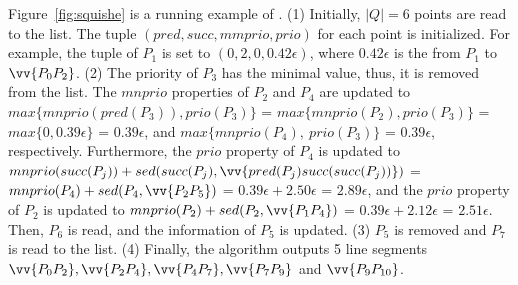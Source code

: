 \begin{example}
\label{exm-alg-squishe}
Figure~\ref{fig:squishe} is a running example of \squishe.
(1) Initially, $|Q| = 6$ points are read to the list. The tuple $(pred, succ, mmprio, prio)$ for each point is initialized. For example, the tuple of $P_1$ is set to $(0, 2, 0, 0.42\epsilon)$, where $0.42\epsilon$ is the \sed from $P_1$ to $\vv{P_0P_2}$.
(2) The priority of $P_3$ has the minimal value, thus, it is removed from the list.
The $mnprio$ properties of $P_2$ and $P_4$ are updated to $max\{mnprio(pred(P_3)), prio(P_3)\}$ = $max\{mnprio(P_2), prio(P_3)\}$ = $max\{0, 0.39\epsilon\}$ = $0.39\epsilon$, and $max\{mnprio(P_4), ~prio(P_3)\}$ = $0.39\epsilon$, respectively.
Furthermore, the $prio$ property of $P_4$ is updated to $mnprio(succ(P_j)) + sed(succ(P_j),\vv{pred(P_{j})succ(succ(P_{j}))})$ = $mnprio(P_4) + sed(P_4,\vv{P_2P_5})$ = $0.39\epsilon + 2.50\epsilon$ = $2.89\epsilon$, and the $prio$ property of $P_2$ is updated to $mnprio(P_2) + sed(P_2,\vv{P_1P_4})$ = $0.39\epsilon + 2.12\epsilon$ = $2.51\epsilon$.
Then, $P_6$ is read, and the information of $P_5$ is updated.
(3) $P_5$ is removed and $P_7$ is read to the list.
(4) Finally, the algorithm outputs 5 line segments $\vv{P_0P_2},\vv{P_2P_4},\vv{P_4P_7},\vv{P_7P_9}$ and $\vv{P_9P_{10}}$.
\end{example}






